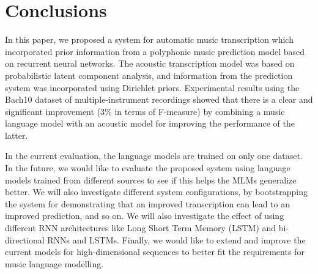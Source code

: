 \section{Conclusions} \label{sec:conclusions}

In this paper, we proposed a system for automatic music transcription which incorporated prior information from a polyphonic music prediction model based on recurrent neural networks. The acoustic transcription model was based on probabilistic latent component analysis, and information from the prediction system was incorporated using Dirichlet priors. Experimental results using the Bach10 dataset of multiple-instrument recordings showed that there is a clear and significant improvement (3\% in terms of F-measure) by combining a music language model with an acoustic model for improving the performance of the latter.

In the current evaluation, the language models are trained on only one dataset. In the future, we would like to evaluate the proposed system using language models trained from different sources to see if this helps the MLMs generalize better. We will also investigate different system configurations, by bootstrapping the system for demonstrating that an improved transcription can lead to an improved prediction, and so on. We will also investigate the effect of using different RNN architectures like Long Short Term Memory (LSTM) and bi-directional RNNs and LSTMs. Finally, we would like to extend and improve the current models for high-dimensional sequences to better fit the requirements for music language modelling. 